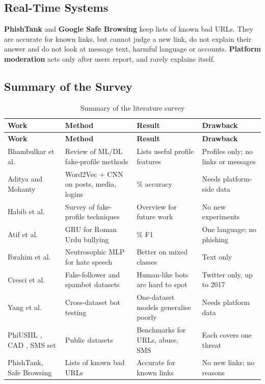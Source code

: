\subsection{Real-Time Systems}
\noindent \textbf{PhishTank} \cite{phishtank} and \textbf{Google Safe Browsing} \cite{safebrowsing} keep lists of known bad URLs. They are accurate for known links, but cannot judge a new link, do not explain their answer and do not look at message text, harmful language or accounts. \textbf{Platform moderation} acts only after users report, and rarely explains itself.

\subsection{Summary of the Survey}
\begin{footnotesize}
\renewcommand{\arraystretch}{1.15}
\begin{longtable}{|>{\raggedright\arraybackslash}p{3.4cm}|>{\raggedright\arraybackslash}p{4.1cm}|>{\raggedright\arraybackslash}p{3.2cm}|>{\raggedright\arraybackslash}p{3.3cm}|}
\caption{Summary of the literature survey}\label{tab:lit}\\
\hline
\textbf{Work} & \textbf{Method} & \textbf{Result} & \textbf{Drawback} \\ \hline
\endfirsthead
\hline
\textbf{Work} & \textbf{Method} & \textbf{Result} & \textbf{Drawback} \\ \hline
\endhead
Bhambulkar et al. \cite{lit1} & Review of ML/DL fake-profile methods & Lists useful profile features & Profiles only; no links or messages \\ \hline
Aditya and Mohanty \cite{lit2} & Word2Vec + CNN on posts, media, logins & 93.5\% accuracy & Needs platform-side data \\ \hline
Habib et al. \cite{lit3} & Survey of fake-profile techniques & Overview for future work & No new experiments \\ \hline
Atif et al. \cite{lit4} & GRU for Roman Urdu bullying & 97\% F1 & One language; no phishing \\ \hline
Ibrahim et al. \cite{lit5} & Neutrosophic MLP for hate speech & Better on mixed classes & Text only \\ \hline
Cresci et al. \cite{cresci2015,cresci2017} & Fake-follower and spambot datasets & Human-like bots are hard to spot & Twitter only, up to 2017 \\ \hline
Yang et al. \cite{yang2020} & Cross-dataset bot testing & One-dataset models generalise poorly & Needs platform data \\ \hline
PhiUSIIL \cite{phiusiil}, CAD \cite{cad}, SMS set \cite{smsdata} & Public datasets & Benchmarks for URLs, abuse, SMS & Each covers one threat \\ \hline
PhishTank, Safe Browsing & Lists of known bad URLs & Accurate for known links & No new links; no reasons \\ \hline
\end{longtable}
\end{footnotesize}

